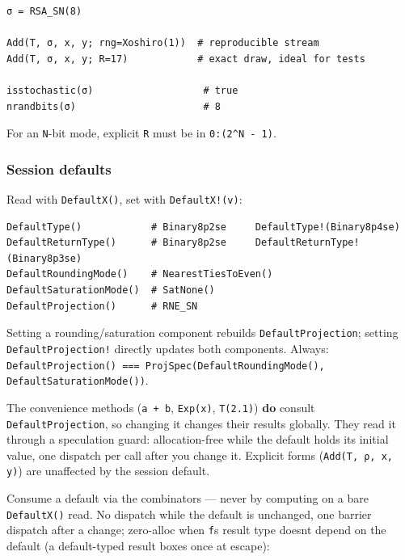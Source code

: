 \begin{verbatim}
σ = RSA_SN(8)

Add(T, σ, x, y; rng=Xoshiro(1))  # reproducible stream
Add(T, σ, x, y; R=17)            # exact draw, ideal for tests

isstochastic(σ)                   # true
nrandbits(σ)                      # 8
\end{verbatim}



For an \texttt{N}-bit mode, explicit \texttt{R} must be in \texttt{0:(2{\textasciicircum}N - 1)}.



\subsubsection{Session defaults}



\label{3970345369238056532}{}


Read with \texttt{DefaultX()}, set with \texttt{DefaultX!(v)}:




\nopagebreak[4]
\begin{verbatim}
DefaultType()            # Binary8p2se     DefaultType!(Binary8p4se)
DefaultReturnType()      # Binary8p2se     DefaultReturnType!(Binary8p3se)
DefaultRoundingMode()    # NearestTiesToEven()
DefaultSaturationMode()  # SatNone()
DefaultProjection()      # RNE_SN
\end{verbatim}



Setting a rounding/saturation component rebuilds \texttt{DefaultProjection}; setting \texttt{DefaultProjection!} directly updates both components. Always: \texttt{DefaultProjection(\allowbreak{}) === ProjSpec(\allowbreak{}DefaultRoundingMode(\allowbreak{}), DefaultSaturationMode(\allowbreak{}))}.



The convenience methods (\texttt{a + b}, \texttt{Exp(x)}, \texttt{T(2.1)}) \textbf{do} consult \texttt{DefaultProjection}, so changing it changes their results globally. They read it through a speculation guard: allocation-free while the default holds its initial value, one dispatch per call after you change it. Explicit forms (\texttt{Add(T, ρ, x, y)}) are unaffected by the session default.



Consume a default via the combinators — never by computing on a bare \texttt{DefaultX()} read. No dispatch while the default is unchanged, one barrier dispatch after a change; zero-alloc when \texttt{f}{\textquotesingle}s result type doesn{\textquotesingle}t depend on the default (a default-typed result boxes once at escape):




